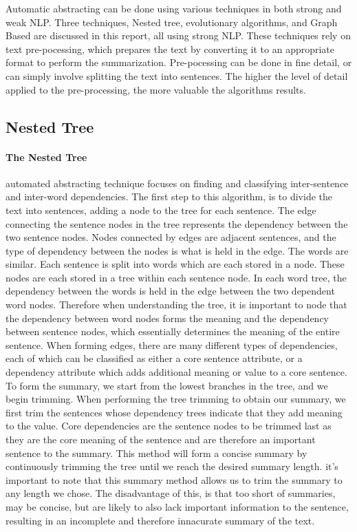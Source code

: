 
Automatic abstracting can be done using various techniques in both strong and weak NLP. Three techniques, Nested tree, evolutionary algorithms, and Graph Based are discussed in this report, all using strong NLP. These techniques rely on text pre-pocessing, which prepares the text by converting it to an appropriate format to perform the summarization. Pre-pocessing can be done in fine detail, or can simply involve splitting the text into sentences. The higher the level of detail applied to the pre-processing, the more valuable the algorithms results.


\subsection{Nested Tree}

	\paragraph{The Nested Tree} automated abstracting technique focuses on finding and classifying inter-sentence and inter-word dependencies. The first step to this algorithm, is to divide the text into sentences, adding a node to the tree for each sentence. The edge connecting the sentence nodes in the tree represents the dependency between the two sentence nodes. Nodes connected by edges are adjacent sentences, and the type of dependency between the nodes is what is held in the edge. The words are similar. Each sentence is split into words which are each stored in a node. These nodes are each stored in a tree within each sentence node. In each word tree, the dependency between the words is held in the edge between the two dependent word nodes. Therefore when understanding the tree, it is important to node that the dependency between word nodes forms the meaning and the dependency between sentence nodes, which essentially determines the meaning of the entire sentence. When forming edges, there are many different types of dependencies, each of which can be classified as either a core sentence attribute, or a dependency attribute which adds additional meaning or value to a core sentence. To form the summary, we start from the lowest branches in the tree, and we begin trimming. When performing the tree trimming to obtain our summary, we first trim the sentences whose dependency trees indicate that they add meaning to the value. Core dependencies are the sentence nodes to be trimmed last as they are the core meaning of the sentence and are therefore an important sentence to the summary. This method will form a concise summary by continuously trimming the tree until we reach the desired summary length. it's important to note that this summary method allows us to trim the summary to any length we chose. The disadvantage of this, is that too short of summaries, may be concise, but are likely to also lack important information to the sentence, resulting in an incomplete and therefore innacurate summary of the text. 



